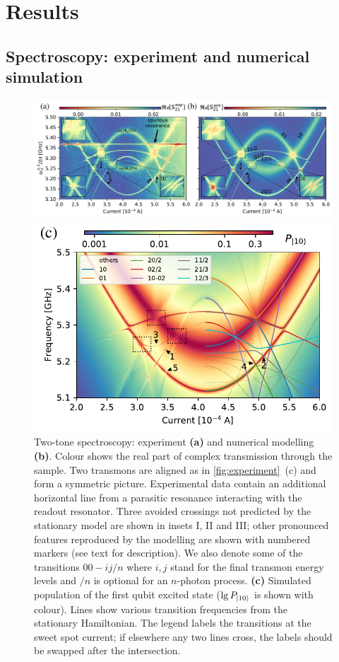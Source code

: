 \documentclass[%
 pra,
 amsmath,amssymb,
 reprint,%
]{revtex4-1}
\begin{document}
\section{Results}

\subsection{\label{sec:level1} Spectroscopy: experiment and numerical simulation}

\begin{figure}
	
	\centering
	\includegraphics[width=\linewidth]{main_picture}
	
	\includegraphics[width=.55\linewidth]{stationary}
	\caption{Two-tone spectroscopy: experiment \textbf{(a)} and numerical modelling \textbf{(b)}. Colour shows the real part of complex transmission  through the sample. Two transmons are aligned as in \autoref{fig:experiment}~(c) and form a symmetric picture. Experimental data contain an additional horizontal line from a parasitic resonance interacting with the readout resonator. Three avoided crossings not predicted by the stationary model are shown in insets I, II and III; other pronounced features reproduced by the modelling are shown with numbered markers (see text for description). We also denote some of the transitions $00 - ij/n$ where $i,j$ stand for the final transmon energy levels and $/n$ is optional for an $n$-photon process. \textbf{(c)} Simulated population of the first qubit excited state ($\lg P_{\ket{10}}$ is shown with colour). Lines show various transition frequencies from the stationary Hamiltonian. The legend labels the transitions at the sweet spot current; if elsewhere any two lines cross, the labels should be swapped after the intersection.}
	\label{fig:two-tone}
\end{figure}
\end{document}
